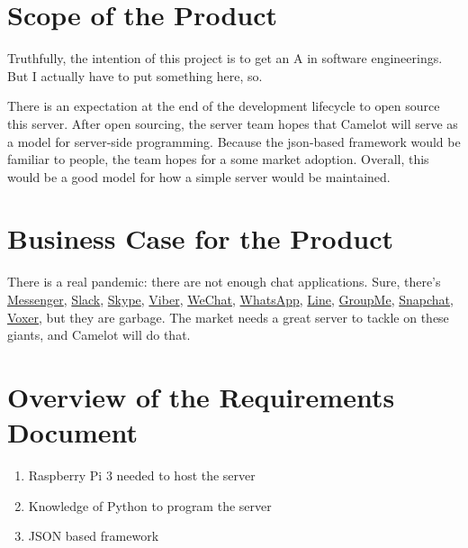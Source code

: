 \section{Scope of the Product}\label{scope-of-the-product}
Truthfully, the intention of this project is to get an A in software engineerings. But I actually have to put something here, so.

There is an expectation at the end of the development lifecycle to open source this server. After open sourcing, the server team hopes that Camelot will serve as a model for server-side programming. Because the \gls{json}-based framework would be familiar to people, the team hopes for a some market adoption. Overall, this would be a good model for how a simple server would be maintained.

\section{Business Case for the Product}\label{business-case-for-the-product}
There is a real pandemic: there are not enough chat applications. Sure, there's
\href{https://www.messenger.com}{Messenger},
\href{https://slack.com/}{Slack},
\href{https://www.skype.com/en/}{Skype},
\href{https://www.viber.com/en/}{Viber},
\href{https://web.wechat.com}{WeChat},
\href{https://www.whatsapp.com}{WhatsApp},
\href{https://line.me/en/}{Line},
\href{https://web.groupme.com}{GroupMe},
\href{https://www.snapchat.com}{Snapchat},
\href{http://voxer.com}{Voxer},
but they are garbage. The market needs a great server to tackle on these giants, and Camelot will do that.

\section{Overview of the Requirements
Document}\label{overview-of-the-requirements-document}
\begin{enumerate}
    \item Raspberry Pi 3 needed to host the server
    \item Knowledge of Python to program the server
    \item JSON based framework
\end{enumerate}
